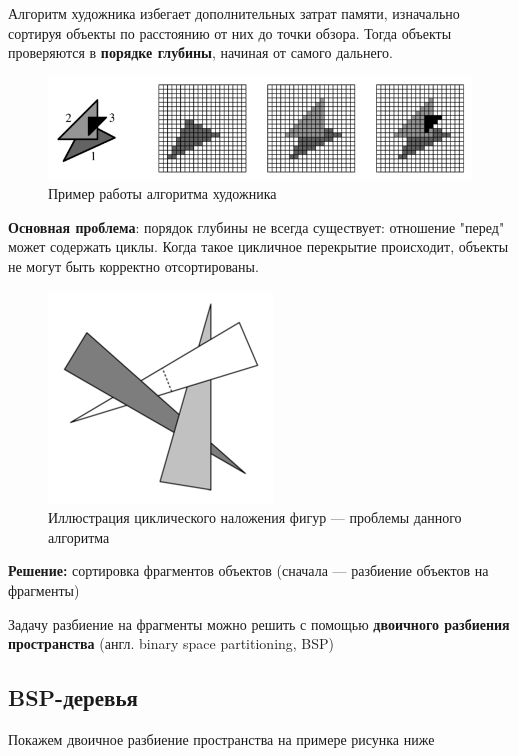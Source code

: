 Алгоритм художника избегает дополнительных затрат памяти, изначально сортируя объекты по расстоянию от них до точки обзора. 
Тогда объекты проверяются в \textbf{порядке глубины}, начиная от самого дальнего.

\begin{figure}[h!]
	\centering
	\includegraphics[width=0.4\linewidth]{img/16_1.png}
	\captionsetup{labelformat=empty}
	\caption{Пример работы алгоритма художника}
\end{figure}


\textbf{Основная проблема}: порядок глубины не всегда существует: отношение "перед" может содержать циклы. Когда такое цикличное перекрытие происходит, объекты не могут быть корректно отсортированы. 

\begin{figure}[h!]
	\centering
	\includegraphics[width=0.4\linewidth]{img/16_2.png}
	\captionsetup{labelformat=empty}
	\caption{Иллюстрация циклического наложения фигур --- проблемы данного алгоритма}
\end{figure}

\textbf{Решение:} сортировка фрагментов объектов (сначала --- разбиение объектов на фрагменты)

Задачу разбиение на фрагменты можно решить с помощью \textbf{двоичного разбиения пространства} (англ. binary space partitioning, BSP)

\newpage
\subsection{BSP-деревья}

Покажем двоичное разбиение пространства на примере рисунка ниже

